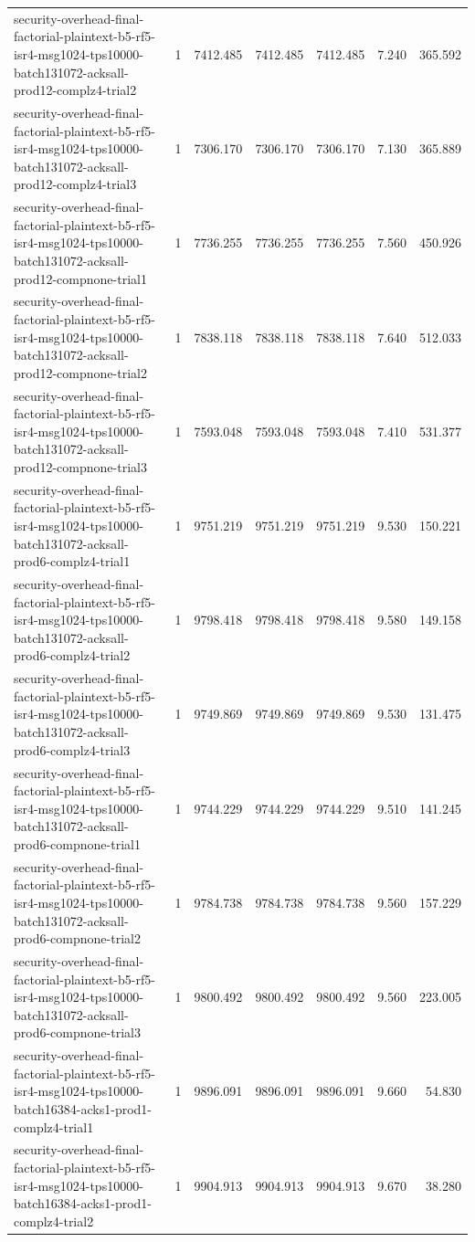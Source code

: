 \begin{tabular}{lrrrrrr}
security-overhead-final-factorial-plaintext-b5-rf5-isr4-msg1024-tps10000-batch131072-acksall-prod12-complz4-trial2 & 1 & 7412.485 & 7412.485 & 7412.485 & 7.240 & 365.592 \\
security-overhead-final-factorial-plaintext-b5-rf5-isr4-msg1024-tps10000-batch131072-acksall-prod12-complz4-trial3 & 1 & 7306.170 & 7306.170 & 7306.170 & 7.130 & 365.889 \\
security-overhead-final-factorial-plaintext-b5-rf5-isr4-msg1024-tps10000-batch131072-acksall-prod12-compnone-trial1 & 1 & 7736.255 & 7736.255 & 7736.255 & 7.560 & 450.926 \\
security-overhead-final-factorial-plaintext-b5-rf5-isr4-msg1024-tps10000-batch131072-acksall-prod12-compnone-trial2 & 1 & 7838.118 & 7838.118 & 7838.118 & 7.640 & 512.033 \\
security-overhead-final-factorial-plaintext-b5-rf5-isr4-msg1024-tps10000-batch131072-acksall-prod12-compnone-trial3 & 1 & 7593.048 & 7593.048 & 7593.048 & 7.410 & 531.377 \\
security-overhead-final-factorial-plaintext-b5-rf5-isr4-msg1024-tps10000-batch131072-acksall-prod6-complz4-trial1 & 1 & 9751.219 & 9751.219 & 9751.219 & 9.530 & 150.221 \\
security-overhead-final-factorial-plaintext-b5-rf5-isr4-msg1024-tps10000-batch131072-acksall-prod6-complz4-trial2 & 1 & 9798.418 & 9798.418 & 9798.418 & 9.580 & 149.158 \\
security-overhead-final-factorial-plaintext-b5-rf5-isr4-msg1024-tps10000-batch131072-acksall-prod6-complz4-trial3 & 1 & 9749.869 & 9749.869 & 9749.869 & 9.530 & 131.475 \\
security-overhead-final-factorial-plaintext-b5-rf5-isr4-msg1024-tps10000-batch131072-acksall-prod6-compnone-trial1 & 1 & 9744.229 & 9744.229 & 9744.229 & 9.510 & 141.245 \\
security-overhead-final-factorial-plaintext-b5-rf5-isr4-msg1024-tps10000-batch131072-acksall-prod6-compnone-trial2 & 1 & 9784.738 & 9784.738 & 9784.738 & 9.560 & 157.229 \\
security-overhead-final-factorial-plaintext-b5-rf5-isr4-msg1024-tps10000-batch131072-acksall-prod6-compnone-trial3 & 1 & 9800.492 & 9800.492 & 9800.492 & 9.560 & 223.005 \\
security-overhead-final-factorial-plaintext-b5-rf5-isr4-msg1024-tps10000-batch16384-acks1-prod1-complz4-trial1 & 1 & 9896.091 & 9896.091 & 9896.091 & 9.660 & 54.830 \\
security-overhead-final-factorial-plaintext-b5-rf5-isr4-msg1024-tps10000-batch16384-acks1-prod1-complz4-trial2 & 1 & 9904.913 & 9904.913 & 9904.913 & 9.670 & 38.280 \\

\end{tabular}
